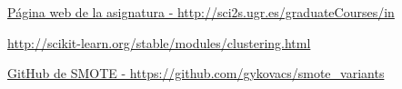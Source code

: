 	
	\newpage
	\begin{thebibliography}{9}
		
		
	\href{}{Página web de la asignatura - http://sci2s.ugr.es/graduateCourses/in}
		
	\href{}{http://scikit-learn.org/stable/modules/clustering.html}
	
	
	\href{}{GitHub de SMOTE - https://github.com/gykovacs/smote\_variants}
	
	

		
		
			
	
		
		
		
		\end{thebibliography}
	
	
	
	

		
	